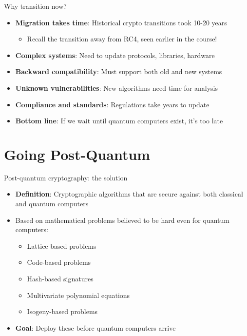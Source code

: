 \documentclass[aspectratio=169, lualatex]{beamer} %
\begin{document}
\begin{frame}{Why transition now?}
	\begin{itemize}
		\item \textbf{Migration takes time}: Historical crypto transitions took 10-20 years
		      \begin{itemize}
			      \item Recall the transition away from RC4, seen earlier in the course!
		      \end{itemize}
		\item \textbf{Complex systems}: Need to update protocols, libraries, hardware
		\item \textbf{Backward compatibility}: Must support both old and new systems
		\item \textbf{Unknown vulnerabilities}: New algorithms need time for analysis
		\item \textbf{Compliance and standards}: Regulations take years to update
		\item \textbf{Bottom line}: If we wait until quantum computers exist, it's too late
	\end{itemize}
\end{frame}

\section{Going Post-Quantum}

\begin{frame}{Post-quantum cryptography: the solution}
	\begin{itemize}
		\item \textbf{Definition}: Cryptographic algorithms that are secure against both classical and quantum computers
		\item Based on mathematical problems believed to be hard even for quantum computers:
		      \begin{itemize}
			      \item Lattice-based problems
			      \item Code-based problems
			      \item Hash-based signatures
			      \item Multivariate polynomial equations
			      \item Isogeny-based problems
		      \end{itemize}
		\item \textbf{Goal}: Deploy these before quantum computers arrive
	\end{itemize}
\end{frame}
\end{document}
